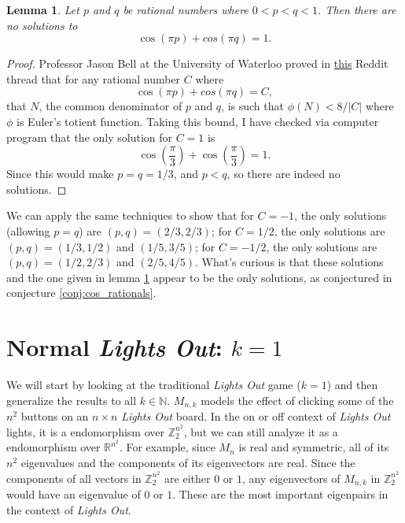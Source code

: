 \documentclass[12pt]{article}
\newtheorem{lemma}{Lemma}
\newcommand{\abs}[1]{\lvert #1 \rvert}
\newcommand{\Z}{\mathbb{Z}}
\newcommand{\R}{\mathbb{R}}
\newcommand{\N}{\mathbb{N}}
\begin{document}
	\begin{lemma}\label{lem:cos_sum1_nosol}
		Let $p$ and $q$ be rational numbers where $0 < p < q < 1$. Then there are no
		solutions to
		\begin{equation*}
		\cos{(\pi p)} + cos{(\pi q)} = 1.
		\end{equation*}
	\end{lemma}
	\begin{proof}
		Professor Jason Bell at the University of Waterloo proved in
		\href{https://www.reddit.com/r/math/comments/gsiqu8/conjecture_about_rational_angles/}{this}
		Reddit thread that for any rational number $C$ where
		\begin{equation*}
		\cos{(\pi p)} + cos{(\pi q)} = C,
		\end{equation*}
		that $N$, the common denominator of $p$ and $q$, is such that $\phi(N) < 8 /
		\abs{C}$ where $\phi$ is Euler's totient function. 
		Taking this bound, I have checked via computer program that the only solution
		for $C = 1$ is
		\begin{equation*}
		\cos{\left(\frac{\pi}{3}\right)} + \cos{\left(\frac{\pi}{3}\right)} = 1.
		\end{equation*}
		Since this would make $p = q = 1/3$, and $p < q$, so there are indeed no
		solutions.
	\end{proof}
	We can apply the same techniques to show that for $C=-1$, the only solutions (allowing $p=q$) are $(p,q) = (2/3,2/3)$; for $C=1/2$, the only solutions are $(p,q) = (1/3,
	1/2)$ and $(1/5, 3/5)$; for $C=-1/2$, the only solutions are $(p,q) = (1/2,
	2/3)$ and $(2/5, 4/5)$.
	What's curious is that these solutions and the one given in lemma
	\ref{lem:cos_sum1_nosol} appear to be the only solutions, as conjectured in
	conjecture \ref{conj:cos_rationals}.
	
	\section{Normal \textit{Lights Out}: $k=1$}
	We will start by looking at the traditional \textit{Lights Out} game ($k=1$)
	and then generalize the results to all $k \in \N$.
	$M_{n,k}$ models the effect of clicking some of the $n^2$ buttons on an $n
	\times n$ \textit{Lights Out} board. 
	In the on or off context of \textit{Lights Out} lights, it is a endomorphism
	over $\Z_2^{n^2}$, but we can still analyze it as a endomorphism over
	$\R^{n^2}$. 
	For example, since $M_n$ is real and symmetric, all of its $n^2$ eigenvalues
	and the components of its eigenvectors are real. 
	Since the components of all vectors in $\Z_2^{n^2}$ are either $0$ or $1$, any
	eigenvectors of $M_{n,k}$ in $\Z_2^{n^2}$ would have an eigenvalue of $0$ or
	$1$. 
	These are the most important eigenpairs in the context of \textit{Lights Out}.
	
\end{document}
